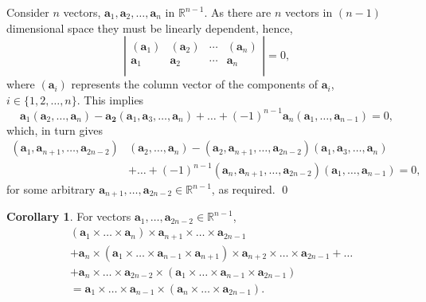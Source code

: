 \documentclass[fleqn,11pt,twoside]{article}
\makeatletter
\renewenvironment{proof}[1][\proofname]{\par
  \normalfont
  \topsep6\p@\@plus6\p@ \trivlist
  \item[\hskip\labelsep\textbf{%
    #1\@addpunct{.}}]\ignorespaces
}{%
  \qed\endtrivlist
}
\theoremstyle{definition}
\newtheorem{cor}{Corollary}
\makeatother
\begin{document}
\begin{proof}
Consider $n$ vectors, $\mathbf{a}_1, \mathbf{a}_2,\dots,\mathbf{a}_n$ in $\mathbb{R}^{n-1}$. As there are $n$ vectors in $(n-1)$ dimensional space they must be linearly dependent, hence,
\begin{equation}
\left|\begin{array}{cccc}
(\mathbf{a}_1)&(\mathbf{a}_2)&\cdots&(\mathbf{a}_n)\\
\mathbf{a}_1&\mathbf{a}_2& \cdots &\mathbf{a}_n\\
\end{array}\right|=0,
\end{equation}
where $(\mathbf{a}_i)$ represents the column vector of the components of $\mathbf{a}_i$, $i\in\{1,2,\dots,n\}$. This implies
\begin{equation}
\mathbf{a}_1(\mathbf{a}_2,\dots,\mathbf{a}_n)-\mathbf{a_2}(\mathbf{a}_1,\mathbf{a}_3,\dots,\mathbf{a}_n)+\dots+(-1)^{n-1}\mathbf{a}_n(\mathbf{a}_1,\dots,\mathbf{a}_{n-1})=0,
\end{equation}
which, in turn gives
\begin{equation}
\begin{split}
(\mathbf{a}_1,\mathbf{a}_{n+1},\dots,\mathbf{a}_{2n-2})&(\mathbf{a}_2,\dots,\mathbf{a}_n)-(\mathbf{a}_2,\mathbf{a}_{n+1},\dots,\mathbf{a}_{2n-2})(\mathbf{a}_1,\mathbf{a}_3,\dots,\mathbf{a}_n)\\
&+\dots+(-1)^{n-1}(\mathbf{a}_n,\mathbf{a}_{n+1},\dots,\mathbf{a}_{2n-2})(\mathbf{a}_1,\dots,\mathbf{a}_{n-1})=0,
\end{split}
\end{equation}
for some arbitrary $\mathbf{a}_{n+1},\dots, \mathbf{a}_{2n-2}\in\mathbb{R}^{n-1}$, as required. 
\end{proof}

\begin{cor}
For vectors $\mathbf{a}_1, \dots, \mathbf{a}_{2n-2}\in\mathbb{R}^{n-1}$,
\begin{equation}
\begin{split}
&(\mathbf{a}_1\times\dots\times\mathbf{a}_n)\times\mathbf{a}_{n+1}\times\dots\times\mathbf{a}_{2n-1}\\
&+\mathbf{a}_n\times(\mathbf{a}_1\times\dots\times\mathbf{a}_{n-1}\times\mathbf{a}_{n+1})\times\mathbf{a}_{n+2}\times\dots\times\mathbf{a}_{2n-1}+\dots\\
&+\mathbf{a}_n\times\dots\times\mathbf{a}_{2n-2}\times(\mathbf{a}_1\times\dots\times\mathbf{a}_{n-1}\times\mathbf{a}_{2n-1})\\
&=\mathbf{a}_1\times\dots\times\mathbf{a}_{n-1}\times(\mathbf{a}_{n}\times\dots\times\mathbf{a}_{2n-1}).
\end{split}
\end{equation}
\end{cor}
\end{document}
